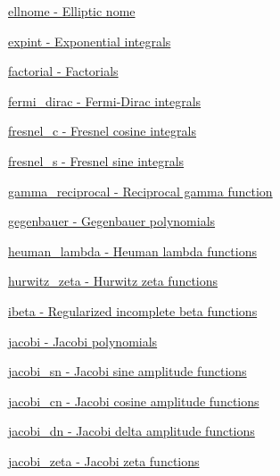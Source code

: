 \begin{DoxyItemize}
\item \hyperlink{group__gnu__math__spec__func_ga7bfb34f8b5c0ed7c72040f9cb7034bba}{ellnome -\/ Elliptic nome}
\item \hyperlink{group__gnu__math__spec__func_ga2cfc699129ceac9cfed87c61e6dc0e08}{expint -\/ Exponential integrals}
\item \hyperlink{group__gnu__math__spec__func_ga48bc268969bfc03eaeaf4bfd457bb25c}{factorial -\/ Factorials}
\item \hyperlink{group__gnu__math__spec__func_ga47dd583a4f3a19f797a5e074e357ba36}{fermi\+\_\+dirac -\/ Fermi-\/\+Dirac integrals}
\item \hyperlink{group__gnu__math__spec__func_gab6a34ce43bad4e8181ad9c40aebb9ada}{fresnel\+\_\+c -\/ Fresnel cosine integrals}
\item \hyperlink{group__gnu__math__spec__func_gaaf6e2b182d0abde6fde72c0b8b9f959c}{fresnel\+\_\+s -\/ Fresnel sine integrals}
\item \hyperlink{group__gnu__math__spec__func_ga5d0da7c5a9ba020da4ed87785a682133}{gamma\+\_\+reciprocal -\/ Reciprocal gamma function}
\item \hyperlink{group__gnu__math__spec__func_ga793df814fb4e1b60e926ead0be14cc87}{gegenbauer -\/ Gegenbauer polynomials}
\item \hyperlink{group__gnu__math__spec__func_gab73b2a75a662785fa102926dca3be59f}{heuman\+\_\+lambda -\/ Heuman lambda functions}
\item \hyperlink{group__gnu__math__spec__func_ga19b3014d94dd102c59a5c7776474be41}{hurwitz\+\_\+zeta -\/ Hurwitz zeta functions}
\item \hyperlink{group__gnu__math__spec__func_gae9a18423e325171ca0c61b411258fa65}{ibeta -\/ Regularized incomplete beta functions}
\item \hyperlink{group__gnu__math__spec__func_ga3dea9ec3774ee5db50276597bbfb0afa}{jacobi -\/ Jacobi polynomials}
\item \hyperlink{group__gnu__math__spec__func_ga5e39ec723669e132e27980dfdf766c19}{jacobi\+\_\+sn -\/ Jacobi sine amplitude functions}
\item \hyperlink{group__gnu__math__spec__func_ga51512996a910489b4554daa7507a48f1}{jacobi\+\_\+cn -\/ Jacobi cosine amplitude functions}
\item \hyperlink{group__gnu__math__spec__func_ga4c2e5ff17abaab5217d4dbcbfd7366d8}{jacobi\+\_\+dn -\/ Jacobi delta amplitude functions}
\item \hyperlink{group__gnu__math__spec__func_gafe1fc209cfe90ceee3b42e077a922045}{jacobi\+\_\+zeta -\/ Jacobi zeta functions}

\end{DoxyItemize}
